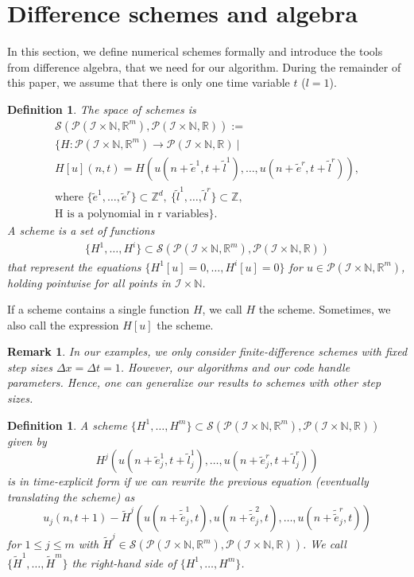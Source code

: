 \documentclass[manuscript]{acmart}
\newcommand{\Rr}{{\mathbb{R}}}
\newcommand{\Nn}{{\mathbb{N}}}
\newcommand{\Zz}{{\mathbb{Z}}}
\newcommand{\1}{{\chi}}
\newcommand{\Ii}{{\mathcal{I}}}
\numberwithin{equation}{section}
\theoremstyle{thmlemcorr}
\numberwithin{theorem}{section}
\theoremstyle{thmlemcorr*}
\theoremstyle{defi}
\newtheorem{definition}[theorem]{Definition}
\theoremstyle{remexample}
\newtheorem{remark}[theorem]{Remark}
\theoremstyle{ass}
\begin{document}
\section{Difference schemes and algebra}
\label{algodetec}
In this section, we define numerical schemes formally and introduce the tools from difference algebra, that we need for our algorithm.
During the remainder of this paper, we assume that there is only one time variable $t$ ($l=1$).
\begin{definition}
	The \emph{space of schemes} is
	\begin{gather*}
		\mathcal{S}(\mathcal{P}(\Ii\times\Nn,\Rr^m),\mathcal{P}(\Ii\times\Nn,\Rr)):=\\
		\Bigg\{H:\mathcal{P}(\Ii\times\Nn,\Rr^m)\rightarrow\mathcal{P}(\Ii\times\Nn,\Rr)\ \Bigg|\\
			H[u](n,t)=H(u(n+\tilde{e}^1,t+\tilde{l}^1),\ldots,u(n+\tilde{e}^r,t+\tilde{l}^r)),\\
			\text{where }
		\{\tilde{e}^1,\ldots,\tilde{e}^r\}\subset\Zz^d,\ \{\tilde{l}^1,\ldots,\tilde{l}^r\}\subset\Zz,\\
		\text{H is a polynomial in r variables}
		\Bigg\}.
	\end{gather*}
	A \emph{scheme} is a set of functions
	\begin{gather*}
		\{H^1,\ldots,H^i\}\subset\mathcal{S}(\mathcal{P}(\Ii\times\Nn,\Rr^m),\mathcal{P}(\Ii\times\Nn,\Rr))
	\end{gather*}
	that represent the equations $\{H^1[u]=0,\ldots,H^i[u]=0\}$ for $u\in\mathcal{P}(\Ii\times\Nn,\Rr^m)$, holding pointwise for all points in $\Ii\times\Nn$.
\end{definition}
If a scheme contains a single function $H$, we call $H$ the scheme. Sometimes, we also call the expression $H[u]$ the scheme.
\begin{remark}
	In our examples, we only consider finite-difference schemes with fixed step sizes $\Delta x=\Delta t=1$. However, our algorithms and our code handle parameters. Hence, one can generalize our results to schemes with other step sizes.
\end{remark}
\begin{definition}
	A scheme $\{H^1,\ldots,H^m\}\subset\mathcal{S}(\mathcal{P}(\Ii\times\Nn,\Rr^m),\mathcal{P}(\Ii\times\Nn,\Rr))$ given by
	\begin{equation*}
		H^j(u(n+\tilde{e}_j^1,t+\tilde{l}_j^1),\ldots,u(n+\tilde{e}_j^r,t+\tilde{l}_j^r))
	\end{equation*}
	is in \emph{time-explicit form} if we can rewrite the previous equation (eventually translating the scheme) as
	\begin{equation*}
		u_j(n,t+1)-\tilde{H}^j(u(n+\tilde{\tilde{e}}_j^1,t),u(n+\tilde{\tilde{e}}_j^2,t),\ldots,u(n+\tilde{\tilde{e}}_j^r,t))
	\end{equation*}
	for $1\leq j\leq m$
	with $\tilde{H}^j\in\mathcal{S}(\mathcal{P}(\Ii\times\Nn,\Rr^m),\mathcal{P}(\Ii\times\Nn,\Rr))$. We call $\{\tilde{H}^1,\ldots,\tilde{H}^m\}$ the right-hand side of $\{H^1,\ldots,H^m\}$.
\end{definition}
\end{document}
